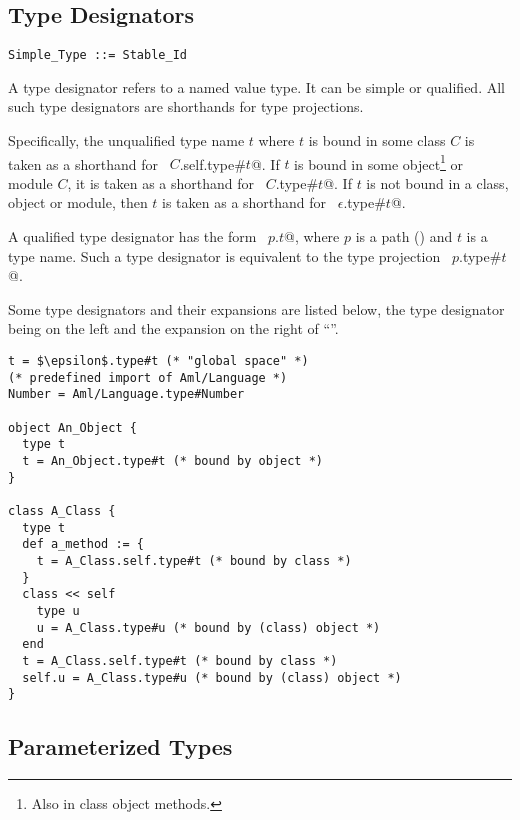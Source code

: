 





\subsection{Type Designators}
\label{sec:type-designators}

\syntax\begin{lstlisting}
Simple_Type ::= Stable_Id
\end{lstlisting}

A type designator refers to a named value type. It can be simple or qualified. All such type designators are shorthands for type projections. 

Specifically, the unqualified type name $t$ where $t$ is bound in some class $C$ is taken as a shorthand for ~\lstinline@$C$.self.type#$t$@. If $t$ is bound in some object\footnote{Also in class object methods.} or module $C$, it is taken as a shorthand for ~\lstinline@$C$.type#$t$@. If $t$ is not bound in a class, object or module, then $t$ is taken as a shorthand for ~\lstinline@$\epsilon$.type#$t$@. 

A qualified type designator has the form ~\lstinline@$p$.$t$@, where $p$ is a path () and $t$ is a type name. Such a type designator is equivalent to the type projection ~\lstinline@$p$.type#$t$@. 

\example Some type designators and their expansions are listed below, the type designator being on the left and the expansion on the right of ``\code{=}''. 
\begin{lstlisting}
t = $\epsilon$.type#t (* "global space" *)
(* predefined import of Aml/Language *)
Number = Aml/Language.type#Number 

object An_Object {
  type t
  t = An_Object.type#t (* bound by object *)
}

class A_Class {
  type t
  def a_method := {
    t = A_Class.self.type#t (* bound by class *)
  }
  class << self
    type u
    u = A_Class.type#u (* bound by (class) object *)
  end
  t = A_Class.self.type#t (* bound by class *)
  self.u = A_Class.type#u (* bound by (class) object *)
}
\end{lstlisting}






\subsection{Parameterized Types}
\label{sec:parameterized-types}

